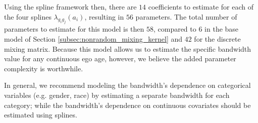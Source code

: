 Using the spline framework then, there are $14$ coefficients to estimate for each of the four splines $\lambda_{g_ig_j}(a_i)$, resulting in $56$ parameters. The total number of parameters to estimate for this model is then $58$, compared to $6$ in the base model of Section \ref{subsec:nonrandom_mixing_kernel} and $42$ for the \citet{McCormick+others:2010} discrete mixing matrix. Because this model allows us to estimate the specific bandwidth value for any continuous ego age, however, we believe the added parameter complexity is worthwhile.

In general, we recommend modeling the bandwidth's dependence on categorical variables (e.g. gender, race) by estimating a separate bandwidth for each category; while the bandwidth's dependence on continuous covariates should be estimated using splines. 
